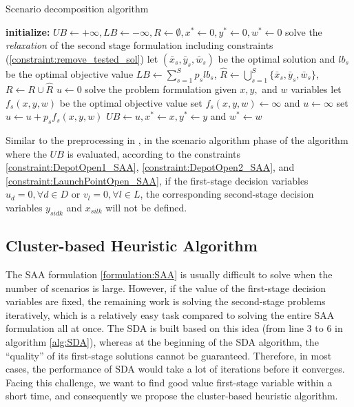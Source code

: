 \documentclass[preprint,review,11pt,authoryear]{elsarticle}
\begin{document}
\begin{algorithm}[h]
    \caption{Scenario decomposition algorithm} \label{alg:SDA}
    \begin{algorithmic}[1]
    \State \textbf{initialize:} $UB \gets +\infty, LB \gets -\infty, R \gets \emptyset, x^* \gets 0, y^* \gets 0, w^* \gets 0$
            \State solve the \textit{relaxation} of the second stage formulation including constraints (\ref{constraint:remove_tested_sol})
            \State let $(\bar{x}_s, \bar{y}_s, \bar{w}_s)$ be the optimal solution and $lb_s$ be the optimal objective value
        \EndFor
        \State $LB \gets \sum_{s=1}^S p_s lb_s$, $\hat{R} \gets \bigcup_{s=1}^S \{\bar{x}_s, \bar{y}_s, \bar{w}_s\}$, $R \gets R \cup \hat{R}$
            \State $u \gets 0$
                \State solve the problem formulation given $x, y,$ and $w$ variables
                \State let $f_s(x, y, w)$ be the optimal objective value
                    \State set $f_s(x, y, w) \gets \infty$ and $u \gets \infty$
                \Else
                    \State set $u \gets u + p_s f_s(x, y, w)$
                \EndIf
            \EndFor
                \State $UB \gets u, x^* \gets x, y^* \gets y$ and $w^* \gets w$
            \EndIf
        \EndFor
    \EndWhile
    \end{algorithmic}
\end{algorithm}
Similar to the preprocessing in \cite{dukkanci2023drones}, in the scenario algorithm phase of the algorithm where the $UB$ is evaluated, according to the constraints \eqref{constraint:DepotOpen1_SAA}, \eqref{constraint:DepotOpen2_SAA}, and \eqref{constraint:LaunchPointOpen_SAA}, if the first-stage decision variables $u_d = 0, \forall d \in D$ or $v_l = 0, \forall l \in L$, the corresponding second-stage decision variables $y_{sidk}$ and $x_{silk}$ will not be defined.

\subsection{Cluster-based Heuristic Algorithm} \label{subsec:Cluster_Heuristic}
The SAA formulation \ref{formulation:SAA} is usually difficult to solve when the number of scenarios is large. However, if the value of the first-stage decision variables are fixed, the remaining work is solving the second-stage problems iteratively, which is a relatively easy task compared to solving the entire SAA formulation all at once. The SDA is built based on this idea (from line 3 to 6 in algorithm \ref{alg:SDA}), whereas at the beginning of the SDA algorithm, the ``quality'' of its first-stage solutions cannot be guaranteed. Therefore, in most cases, the performance of SDA would take a lot of iterations before it converges. Facing this challenge, we want to find good value first-stage variable within a short time, and consequently we propose the cluster-based heuristic algorithm. 
\end{document}
